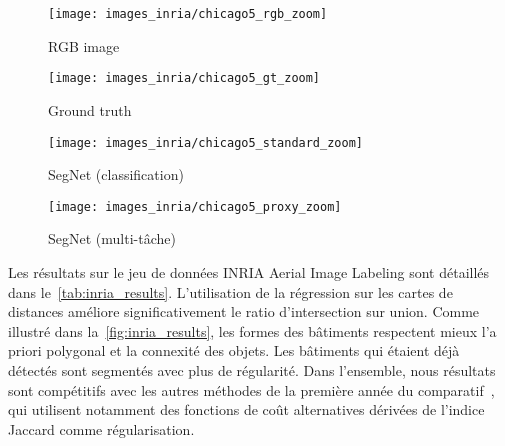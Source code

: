 \begin{figure*}[t]
\begin{subfigure}{0.24\textwidth}
	\texttt{[image: images\_inria/chicago5\_rgb\_zoom]}
    \caption{RGB image}
\end{subfigure}
\begin{subfigure}{0.24\textwidth}
	\texttt{[image: images\_inria/chicago5\_gt\_zoom]}
    \caption{Ground truth}
\end{subfigure}
\begin{subfigure}{0.24\textwidth}
	\texttt{[image: images\_inria/chicago5\_standard\_zoom]}
    \caption{SegNet (classification)}
\end{subfigure}
\begin{subfigure}{0.24\textwidth}
	\texttt{[image: images\_inria/chicago5\_proxy\_zoom]}
    \caption{SegNet (multi-tâche)}
\end{subfigure}
\caption{Extrait des résultats de segmentation sur le jeu de données INRIA Aerial Image Labeling. Les pixels corrects sont en \textcolor{OliveGreen}{vert}, les faux positifs en \textcolor{Lavender}{rose} et les faux négatifs en \textcolor{Blue}{bleu}. L'approche multi-tâche capture mieux la structure spatiale des objets.}
\label{fig:inria_results}
\end{figure*}

Les résultats sur le jeu de données INRIA Aerial Image Labeling sont détaillés dans le~\cref{tab:inria_results}. L'utilisation de la régression sur les cartes de distances améliore significativement le ratio d'intersection sur union. Comme illustré dans la~\cref{fig:inria_results}, les formes des bâtiments respectent mieux l'a priori polygonal et la connexité des objets. Les bâtiments qui étaient déjà détectés sont segmentés avec plus de régularité. Dans l'ensemble, nous résultats sont compétitifs avec les autres méthodes de la première année du comparatif~\cite{huang_large-scale_2018}, qui utilisent notamment des fonctions de coût alternatives dérivées de l'indice Jaccard comme régularisation.

